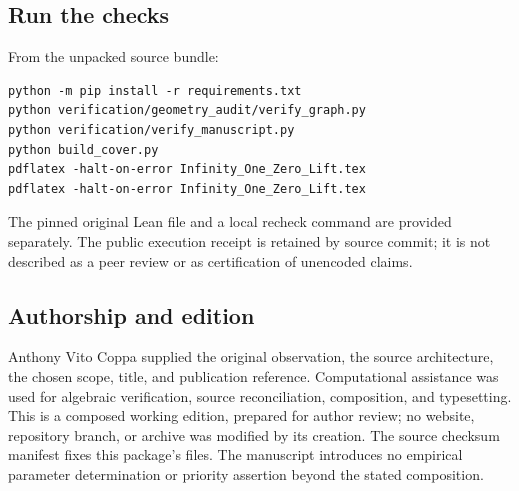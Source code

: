 \documentclass[11pt]{article}
\theoremstyle{definition}\newtheorem{definition}[theorem]{Definition}
\begin{document}
\subsection*{Run the checks}
From the unpacked source bundle:
\begin{verbatim}
python -m pip install -r requirements.txt
python verification/geometry_audit/verify_graph.py
python verification/verify_manuscript.py
python build_cover.py
pdflatex -halt-on-error Infinity_One_Zero_Lift.tex
pdflatex -halt-on-error Infinity_One_Zero_Lift.tex
\end{verbatim}
The pinned original Lean file and a local recheck command are provided separately. The public execution receipt is retained by source commit; it is not described as a peer review or as certification of unencoded claims.

\subsection*{Authorship and edition}
Anthony Vito Coppa supplied the original observation, the source architecture, the chosen scope, title, and publication reference. Computational assistance was used for algebraic verification, source reconciliation, composition, and typesetting. This is a composed working edition, prepared for author review; no website, repository branch, or archive was modified by its creation. The source checksum manifest fixes this package's files. The manuscript introduces no empirical parameter determination or priority assertion beyond the stated composition.
\end{document}

